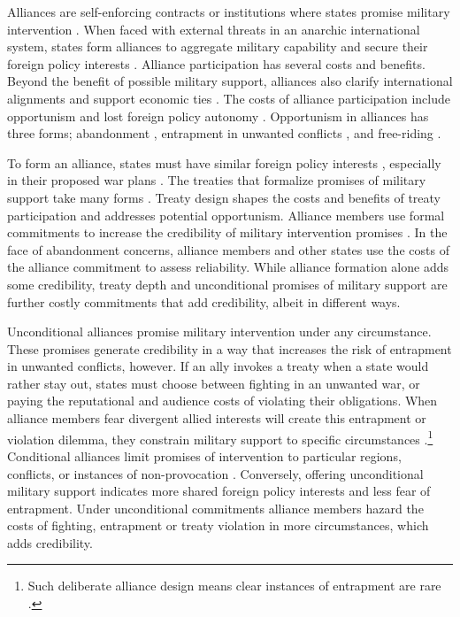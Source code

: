 \documentclass[12pt]{article}
\begin{document}
Alliances are self-enforcing contracts or institutions where states promise military intervention \citep{Leedsetal2002, Morrow2000}. 
When faced with external threats in an anarchic international system, states form alliances to aggregate military capability and secure their foreign policy interests \citep{Altfield1984, Smith1995, Snyder1997, FordhamPoast2014}.
Alliance participation has several costs and benefits.
Beyond the benefit of possible military support, alliances also clarify international alignments \citep{Snyder1990} and support economic ties \citep{Gowa1995, Li2003, Long2003, Fordham2010, WolfordKim2017}.  
The costs of alliance participation include opportunism and lost foreign policy autonomy \citep{Altfield1984, Morrow2000, Johnson2015}. 
Opportunism in alliances has three forms; abandonment \citep{Leeds2003a, BerkemeierFuhrmann2018}, entrapment in unwanted conflicts \citep{Snyder1984}, and free-riding \citep{Morrow2000}.


To form an alliance, states must have similar foreign policy interests \citep{Morrow1991, Smith1995, FordhamPoast2014}, especially in their proposed war plans \citep{Poast2019a}. 
The treaties that formalize promises of military support take many forms \citep{Leedsetal2000, Leedsetal2002, Benson2012, BensonClinton2016}. 
Treaty design shapes the costs and benefits of treaty participation and addresses potential opportunism. 
Alliance members use formal commitments to increase the credibility of military intervention promises \citep{Morrow2000}. 
In the face of abandonment concerns, alliance members and other states use the costs of the alliance commitment to assess reliability. 
While alliance formation alone adds some credibility, treaty depth and unconditional promises of military support are further costly commitments that add credibility, albeit in different ways.  


Unconditional alliances promise military intervention under any circumstance. 
These promises generate credibility in a way that increases the risk of entrapment in unwanted conflicts, however. 
If an ally invokes a treaty when a state would rather stay out, states must choose between fighting in an unwanted war, or paying the reputational \citep{Gibler2008, Crescenzietal2012} and audience \citep{Fearon1997} costs of violating their obligations.
When alliance members fear divergent allied interests will create this entrapment or violation dilemma, they constrain military support to specific circumstances \citep{Kim2011, Benson2012}.\footnote{Such deliberate alliance design means clear instances of entrapment are rare \citep{Kim2011, Beckley2015}.} 
Conditional alliances limit promises of intervention to particular regions, conflicts, or instances of non-provocation \citep{Leedsetal2000}. 
Conversely, offering unconditional military support indicates more shared foreign policy interests and less fear of entrapment.
Under unconditional commitments alliance members hazard the costs of fighting, entrapment or treaty violation in more circumstances, which adds credibility.  
\end{document}
